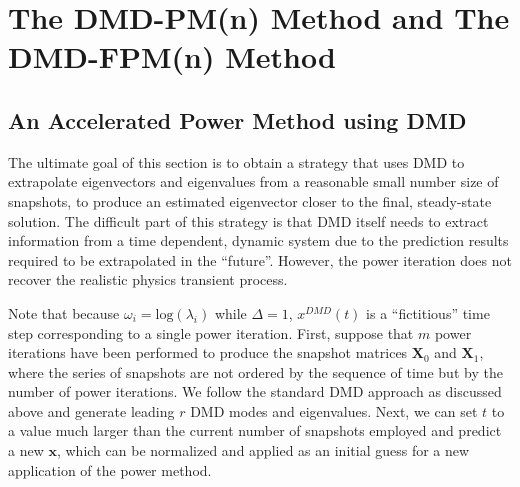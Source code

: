 \cleardoublepage

\chapter{The DMD-PM(n) Method and The DMD-FPM(n) Method}
\label{chapter:DMD-FPM(n)}

\section{An Accelerated Power Method using DMD}
\label{sec:dmdpi}
The ultimate goal of this section is to obtain a strategy that uses DMD to extrapolate eigenvectors and eigenvalues from a reasonable small number size of snapshots, to produce an estimated eigenvector closer to the final, steady-state solution.
The difficult part of this strategy is that DMD itself needs to extract information from a time dependent, dynamic system due to the prediction results required to be extrapolated in the ``future''.
However, the power iteration does not recover the realistic physics transient process. 

Note that because $\omega_i= \text{log}(\lambda_i)$ while $\Delta = 1$, $x^{DMD}(t)$ is a ``fictitious'' time step corresponding to a single power iteration.
First, suppose that $m$ power iterations have been performed to produce the snapshot matrices $\mathbf{X}_0$ and $\mathbf{X}_1$, where the series of snapshots are not ordered by the sequence of time but by the number of power iterations.
We follow the standard DMD approach as discussed above and generate leading $r$ DMD modes and eigenvalues.
Next, we can set $t$ to a value much larger than the current number of snapshots employed and predict a new $\mathbf{x}$, which can be normalized and applied as an initial guess for a new application of the power method.

